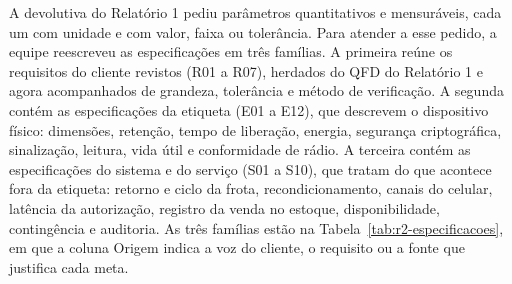 A devolutiva do Relatório 1 pediu parâmetros quantitativos e mensuráveis, cada um com unidade e com valor, faixa ou tolerância. Para atender a esse pedido, a equipe reescreveu as especificações em três famílias. A primeira reúne os requisitos do cliente revistos (R01 a R07), herdados do QFD do Relatório 1 e agora acompanhados de grandeza, tolerância e método de verificação. A segunda contém as especificações da etiqueta (E01 a E12), que descrevem o dispositivo físico: dimensões, retenção, tempo de liberação, energia, segurança criptográfica, sinalização, leitura, vida útil e conformidade de rádio. A terceira contém as especificações do sistema e do serviço (S01 a S10), que tratam do que acontece fora da etiqueta: retorno e ciclo da frota, recondicionamento, canais do celular, latência da autorização, registro da venda no estoque, disponibilidade, contingência e auditoria. As três famílias estão na Tabela~\ref{tab:r2-especificacoes}, em que a coluna Origem indica a voz do cliente, o requisito ou a fonte que justifica cada meta.

